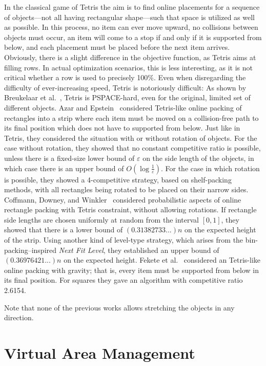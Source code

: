 \documentclass[10pt,journal]{IEEEtran}
\begin{document}
In the classical game of Tetris the aim is to find online placements
for a sequence of objects---not all having rectangular shape---such
that space is utilized as well as possible. In this
process, no item can ever move upward, no collisions between objects
must occur, an item will come to a stop if and only if it is supported
from below, and each placement must be placed before the next item
arrives. Obviously, there is a
slight difference in the objective function, as Tetris aims at filling
rows. In actual optimization scenarios, this is less interesting, as
it is not critical whether a row is used to precisely 100\%. 
Even when disregarding the difficulty of ever-increasing
speed, Tetris is notoriously difficult: As shown by Breukelaar et
al.~\cite{bdhhkl-tihea-04}, Tetris is PSPACE-hard, even for the
original, limited set of different objects. Azar and
Epstein~\cite{ae-tdp-97} considered Tetris-like online packing of
rectangles into a strip where each item must be moved on a collision-free 
path to its final position which does not have to supported from
below. Just like in Tetris, they considered the situation with or
without rotation of objects. For the case without rotation, they
showed that no constant competitive ratio is possible, unless there is
a fixed-size lower bound of $\varepsilon$ on the side length of the
objects, in which case there is an upper bound of
$O(\log\frac{1}{\varepsilon})$. For the case in which rotation is
possible, they showed a 4-competitive strategy, based on shelf-packing
methods, with all rectangles being rotated to be placed on their
narrow sides. Coffmann, Downey, and Winkler~\cite{cdw-prs-02}
considered probabilistic aspects of online rectangle packing with
Tetris constraint, without allowing rotations. If rectangle side
lengths are chosen uniformly at random from the interval $[0,1]$, they
showed that there is a lower bound of $(0.31382733...)n$ on the
expected height of the strip. Using another kind of level-type
strategy, which arises from the bin-packing--inspired {\em Next Fit
  Level}, they established an upper bound of $(0.36976421...)n$ on the
expected height. 
Fekete et al.~\cite{fks-olsp-09p} considered an Tetris-like online packing
with gravity; that is, every item must be supported from
below in its final position. For squares they gave an algorithm with
competitive ratio 2.6154. 

Note that none of the previous works allows
stretching the objects in any direction.


\section{Virtual Area Management}
\end{document}
